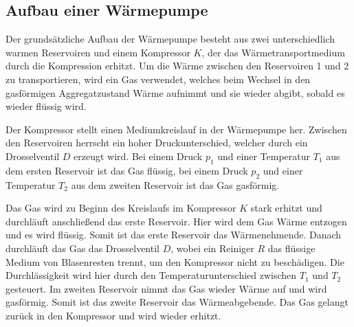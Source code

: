 \subsection{Aufbau einer Wärmepumpe}


    Der grundsätzliche Aufbau der Wärmepumpe besteht aus zwei unterschiedlich warmen Reservoiren und einem Kompressor $K$,
    der das Wärmetransportmedium durch die Kompression erhitzt.
    Um die Wärme zwischen den Reservoiren 1 und 2 zu transportieren, wird ein Gas verwendet, welches beim Wechsel in den gasförmigen
    Aggregatzustand Wärme aufnimmt und sie wieder abgibt, sobald es wieder flüssig wird.

    Der Kompressor stellt einen Mediumkreislauf in der Wärmepumpe her.
    Zwischen den Reservoiren herrscht ein hoher Druckunterschied, welcher durch ein Drosselventil $D$ erzeugt wird.
    Bei einem Druck $p_1$ und einer Temperatur $T_1$ aus dem ersten Reservoir ist das Gas flüssig,
    bei einem Druck $p_2$ und einer Temperatur $T_2$ aus dem zweiten Reservoir ist das Gas gasförmig.

    Das Gas wird zu Beginn des Kreislaufs im Kompressor $K$ stark erhitzt und durchläuft anschließend das erste Reservoir.
    Hier wird dem Gas Wärme entzogen und es wird flüssig. Somit ist das erste Reservoir das Wärmenehmende.
    Danach durchläuft das Gas das Drosselventil $D$, wobei ein Reiniger $R$ das flüssige Medium von Blasenresten trennt, um den Kompressor nicht zu beschädigen.
    Die Durchlässigkeit wird hier durch den Temperaturunterschied zwischen $T_1$ und $T_2$ gesteuert.
    Im zweiten Reservoir nimmt das Gas wieder Wärme auf und wird gasförmig. Somit ist das zweite Reservoir das Wärmeabgebende.
    Das Gas gelangt zurück in den Kompressor und wird wieder erhitzt.


